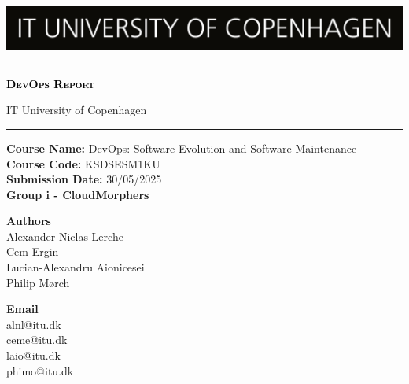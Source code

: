 \begin{titlepage}

\centering
\includegraphics[width=\textwidth]{images/FrontPage/ITU_logo_en.jpg}
	\textcolor{black}{\rule{\linewidth}{1pt}} \par
     {\scshape\Huge\bfseries \textcolor{black}{DevOps Report}\par} 
	\vspace{1pt}
	IT University of Copenhagen
	\textcolor{black}{\rule{\linewidth}{1pt}} \par
	\vspace*{0.25cm}
 \textbf{Course Name:} DevOps: Software Evolution and Software Maintenance\\
\textbf{Course Code:} KSDSESM1KU\\
\textbf{Submission Date:} 30/05/2025\\
\textbf{Group i - CloudMorphers} \\
 
\vspace*{1cm}
 
\begin{minipage}{0.75\textwidth}
    \begin{flushleft}
        \textbf{Authors}\\
        Alexander Niclas Lerche\\
        Cem Ergin\\
        Lucian-Alexandru Aionicesei\\
        Philip Mørch
    \end{flushleft}
    \end{minipage}
    \begin{minipage}{0.20\textwidth}
    \begin{flushright}
        \textbf{Email}\\
        alnl@itu.dk\\
        ceme@itu.dk\\
        laio@itu.dk\\
        phimo@itu.dk
    \end{flushright}
\end{minipage}

\end{titlepage}
